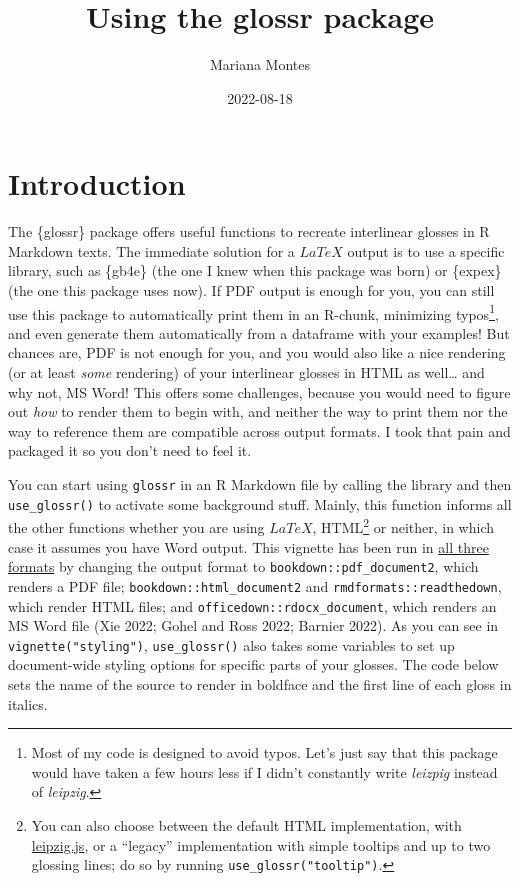 \documentclass[
  letterpaper,
  DIV=11,
  numbers=noendperiod]{scrartcl}
\title{Using the glossr package}
\author{Mariana Montes}
\date{2022-08-18}
\begin{document}
\maketitle
\ifdefined\Shaded\renewenvironment{Shaded}{\begin{tcolorbox}[frame hidden, enhanced, boxrule=0pt, breakable, sharp corners, interior hidden, borderline west={3pt}{0pt}{shadecolor}]}{\end{tcolorbox}}\fi

\hypertarget{introduction}{%
\section{Introduction}\label{introduction}}

The \{glossr\} package offers useful functions to recreate interlinear
glosses in R Markdown texts. The immediate solution for a \(LaTeX\)
output is to use a specific library, such as \{gb4e\} (the one I knew
when this package was born) or \{expex\} (the one this package uses
now). If PDF output is enough for you, you can still use this package to
automatically print them in an R-chunk, minimizing typos\footnote{Most
  of my code is designed to avoid typos. Let's just say that this
  package would have taken a few hours less if I didn't constantly write
  \emph{leizpig} instead of \emph{leipzig}.}, and even generate them
automatically from a dataframe with your examples! But chances are, PDF
is not enough for you, and you would also like a nice rendering (or at
least \emph{some} rendering) of your interlinear glosses in HTML as
well\ldots{} and why not, MS Word! This offers some challenges, because
you would need to figure out \emph{how} to render them to begin with,
and neither the way to print them nor the way to reference them are
compatible across output formats. I took that pain and packaged it so
you don't need to feel it.

You can start using \texttt{glossr} in an R Markdown file by calling the
library and then \texttt{use\_glossr()} to activate some background
stuff. Mainly, this function informs all the other functions whether you
are using \(LaTeX\), HTML\footnote{You can also choose between the
  default HTML implementation, with
  \href{https://github.com/bdchauvette/leipzig.js/}{leipzig.js}, or a
  ``legacy'' implementation with simple tooltips and up to two glossing
  lines; do so by running \texttt{use\_glossr("tooltip")}.} or neither,
in which case it assumes you have Word output. This vignette has been
run in
\href{https://github.com/montesmariana/glossr/tree/main/inst/examples}{all
three formats} by changing the output format to
\texttt{bookdown::pdf\_document2}, which renders a PDF file;
\texttt{bookdown::html\_document2} and \texttt{rmdformats::readthedown},
which render HTML files; and \texttt{officedown::rdocx\_document}, which
renders an MS Word file (Xie 2022; Gohel and Ross 2022; Barnier 2022).
As you can see in \texttt{vignette("styling")}, \texttt{use\_glossr()}
also takes some variables to set up document-wide styling options for
specific parts of your glosses. The code below sets the name of the
source to render in boldface and the first line of each gloss in
italics.
\end{document}
